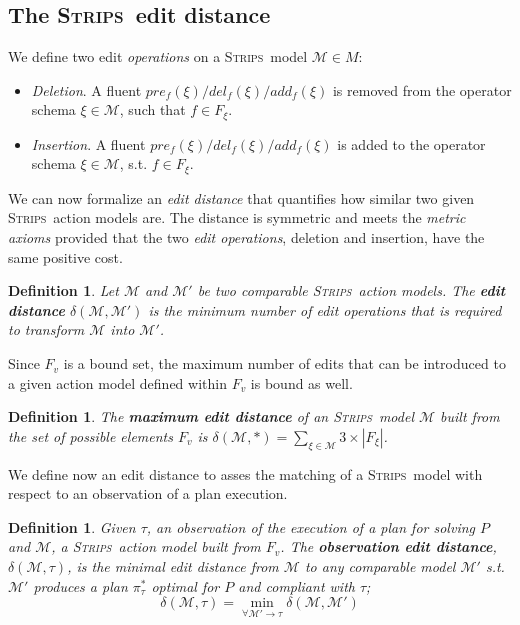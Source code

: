 \documentclass[letterpaper]{article} %
\newcommand{\strips}{\textsc{Strips}}     %
\newtheorem{definition}[theorem]{Definition}
\begin{document}
\subsection{The \strips\ edit distance}
We define two edit \emph{operations} on a \strips\ model $\mathcal{M}\in M$:
\begin{itemize}
\item {\em Deletion}. A fluent $pre_f(\xi)/del_f(\xi)/add_f(\xi)$ is removed from the operator schema $\xi\in\mathcal{M}$, such that $f\in F_{\xi}$.
\item {\em Insertion}. A fluent $pre_f(\xi)/del_f(\xi)/add_f(\xi)$ is added to the operator schema $\xi\in\mathcal{M}$, s.t. $f\in F_{\xi}$.
\end{itemize}

We can now formalize an {\em edit distance} that quantifies how similar two given \strips\ action models are. The distance is symmetric and meets the {\em metric axioms} provided that the two {\em edit operations}, deletion and insertion, have the same positive cost.

\begin{definition}
  Let $\mathcal{M}$ and $\mathcal{M}'$ be two {\em comparable} \strips\ action models. The {\bf edit distance} $\delta(\mathcal{M},\mathcal{M}')$ is the minimum number of {\em edit operations} that is required to transform $\mathcal{M}$ into $\mathcal{M}'$.
\end{definition}

Since $F_v$ is a bound set, the maximum number of edits that can be introduced to a given action model defined within $F_v$ is bound as well. 
\begin{definition}
The \textbf{maximum edit distance} of an \strips\ model $\mathcal{M}$ built from the set of possible elements $F_v$ is $\delta(\mathcal{M},*)=\sum_{\xi\in\mathcal{M}} 3\times|F_{\xi}|$.
\end{definition}

We define now an edit distance to asses the matching of a \strips\ model with respect to an observation of a plan execution. 

\begin{definition}
  Given $\tau$, an observation of the execution of a plan for solving $P$ and $\mathcal{M}$, a \strips\ action model built from $F_v$. The {\bf observation edit distance}, $\delta(\mathcal{M},\tau)$, is the minimal edit distance from $\mathcal{M}$ to any {\em comparable} model $\mathcal{M}'$ s.t. $\mathcal{M}'$ produces a plan $\pi^*_\tau$ optimal for $P$ and compliant with $\tau$; \[\delta(\mathcal{M},\tau)=\min_{\forall \mathcal{M}' \rightarrow \tau} \delta(\mathcal{M},\mathcal{M}')\]
\end{definition}
\end{document}
